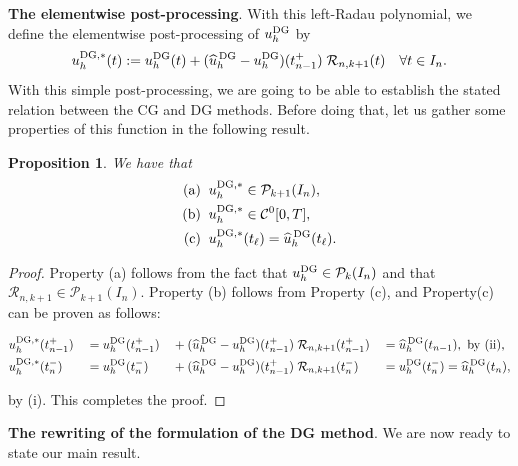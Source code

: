 \documentclass[bpam,reqno]{ipart}
\newtheorem{proposition}{Proposition}[section]
\begin{document}
 {\bf The elementwise post-processing}.
 With this left-Radau polynomial, we define the elementwise post-processing of $u_h^{{\rm DG}}$ by
\[
 u^{{\rm DG},*}_h(t):=u^{{\rm DG}}_h(t)+(\widehat{u}^{\,{\rm DG}}_h-u^{{\rm DG}}_h)(t^+_{n-1}) \; \mathcal{R}_{n,k+1}(t) \quad\forall t\in I_n.
 \]
 With this simple post-processing, we are going to be able to establish the stated relation between the CG and DG methods. Before doing that, let us gather some properties of this function in the following result.
\begin{proposition}
\label{proposition3.1}
We have that
 \begin{alignat*}{2}
 {\text{\rm(a)}}& \;\; u^{{\rm DG},*}_h \in \mathcal{P}_{k+1}(I_n),
 \\
 {\text{\rm(b)}}&  \;\; u^{{\rm DG},*}_h \in \mathcal{C}^0[0,T],
 \\
 {\text{\rm(c)}}&  \;\; u^{{\rm DG},*}_h(t_\ell)=\widehat{u}^{\,{\rm DG}}_h(t_\ell).
 \end{alignat*}
 \end{proposition}
 \begin{proof}
Property (a) follows from the fact that 
$u^{{\rm DG}}_h\in\mathcal{P}_k(I_n)$ and that  {$\mathcal{R}_{n,k+1} \in \mathcal{P}_{k+1}(I_n)$.} Property (b) follows from Property (c), and Property(c) can be proven as follows:


\small{
\begin{alignat*}{6}
&u^{{\rm DG},*}_h(t^+_{n-1})&&= u^{{\rm DG}}_h(t^+_{n-1})&&+(\widehat{u}^{\,{\rm DG}}_h-u^{{\rm DG}}_h)(t^+_{n-1}) \; \mathcal{R}_{n,k+1}(t^+_{n-1}) &&={\widehat{u}^{\,{\rm DG}}_h(t_{n-1})},\text{ by (ii),}
\\
&u^{{\rm DG},*}_h(t^-_{n})&&= u^{{\rm DG}}_h(t^-_{n})&&+(\widehat{u}^{\,{\rm DG}}_h-u^{{\rm DG}}_h)(t^+_{n-1}) \; \mathcal{R}_{n,k+1}(t^-_{n}) &&={u}^{{\rm DG}}_h(t^-_{n})= \widehat{u}^{\,{\rm DG}}_h(t_{n}),
\end{alignat*}
}

\noindent by (i). This completes the proof.
\end{proof}

{\bf The rewriting of the formulation of the DG method}.
We are now ready to state our main result.
\end{document}
